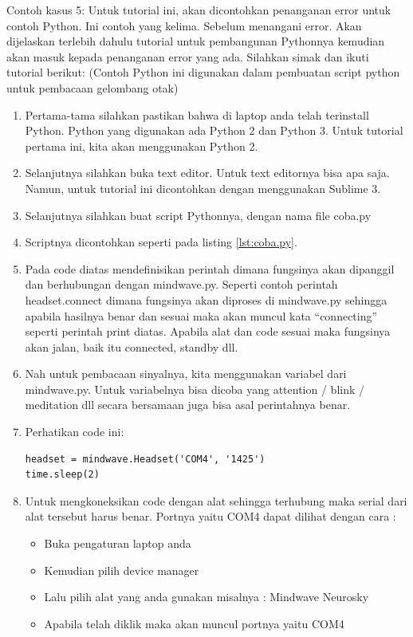 Contoh kasus 5: Untuk tutorial ini, akan dicontohkan penanganan error untuk contoh Python. Ini contoh yang kelima. Sebelum menangani error. Akan dijelaskan terlebih dahulu tutorial untuk pembangunan Pythonnya kemudian akan masuk kepada penanganan error yang ada. Silahkan simak dan ikuti tutorial berikut: 
(Contoh Python ini digunakan dalam pembuatan script python untuk pembacaan gelombang otak)
\begin{enumerate}
\item Pertama-tama silahkan pastikan bahwa di laptop anda telah terinstall Python. Python yang digunakan ada Python 2 dan Python 3. Untuk tutorial pertama ini, kita akan menggunakan Python 2.
\item Selanjutnya silahkan buka text editor. Untuk text editornya bisa apa saja. Namun, untuk tutorial ini dicontohkan dengan menggunakan Sublime 3.
\item Selanjutnya silahkan buat script Pythonnya, dengan nama file coba.py
\item Scriptnya dicontohkan seperti pada listing \ref{lst:coba.py}.

\item Pada code diatas mendefinisikan perintah dimana fungsinya akan dipanggil dan berhubungan dengan mindwave.py. Seperti contoh perintah headset.connect dimana fungsinya akan diproses di mindwave.py sehingga apabila hasilnya benar dan sesuai maka akan muncul kata “connecting” seperti perintah print diatas. Apabila alat dan code sesuai maka fungsinya akan jalan, baik itu connected, standby dll. 
\item Nah untuk pembacaan sinyalnya, kita menggunakan variabel dari mindwave.py. Untuk variabelnya bisa dicoba yang attention / blink / meditation dll secara bersamaan juga bisa asal perintahnya benar.
\item Perhatikan code ini:
\begin{verbatim}
headset = mindwave.Headset('COM4', '1425')
time.sleep(2)
\end{verbatim}
\item Untuk mengkoneksikan code dengan alat sehingga terhubung maka serial dari alat tersebut harus benar. Portnya yaitu COM4 dapat dilihat dengan cara :
\begin{itemize}
\item Buka pengaturan laptop anda
\item Kemudian pilih device manager
\item Lalu pilih alat yang anda gunakan misalnya : Mindwave Neurosky
\item Apabila telah diklik maka akan muncul portnya yaitu COM4 

\end{itemize}
\end{enumerate}
